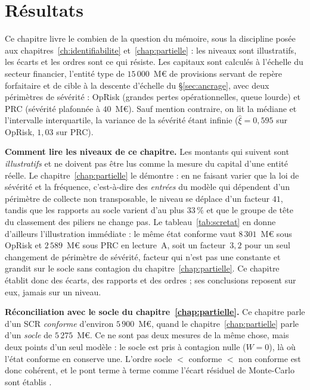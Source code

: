 \chapter{Résultats}
\label{chap:resultats}

Ce chapitre livre le \og combien \fg{} de la question du mémoire, sous la discipline posée
aux chapitres~\ref{ch:identifiabilite} et~\ref{chap:partielle} : les niveaux sont
illustratifs, les écarts et les ordres sont ce qui résiste. Les capitaux sont calculés à
l'échelle du secteur financier, l'entité type de $15\,000$~M\euro{} de provisions servant de
repère forfaitaire et de cible à la descente d'échelle du \S\ref{sec:ancrage}, avec
deux périmètres de sévérité : OpRisk (grandes pertes opérationnelles, queue lourde)
et PRC (sévérité plafonnée à $40$~M\euro). Sauf mention contraire, on lit la médiane
et l'intervalle interquartile, la variance de la sévérité étant infinie ($\hat\xi=0{,}595$ sur
OpRisk, $1{,}03$ sur PRC).

\begin{attention}
\textbf{Comment lire les niveaux de ce chapitre.} Les montants qui suivent sont
\emph{illustratifs} et ne doivent pas être lus comme la mesure du capital d'une entité réelle.
Le chapitre~\ref{chap:partielle} le démontre : en ne faisant varier que la loi de sévérité et la
fréquence, c'est-à-dire des \emph{entrées} du modèle qui dépendent d'un périmètre de collecte
non transposable, le niveau se déplace d'un facteur $41$, tandis que les rapports au socle
varient d'au plus $33\,\%$ et que le groupe de tête du classement des piliers ne change pas. Le
tableau~\ref{tab:scretat} en donne d'ailleurs l'illustration immédiate : le même état conforme
vaut $8\,301$~M\euro{} sous OpRisk et $2\,589$~M\euro{} sous PRC en lecture~A, soit un
facteur~$3{,}2$ pour un seul changement de périmètre de sévérité, facteur qui n'est pas une
constante et grandit sur le socle sans contagion du chapitre~\ref{chap:partielle}. Ce chapitre établit donc des écarts, des
rapports et des ordres ; ses conclusions reposent sur eux, jamais sur un niveau.
\end{attention}

\begin{cle}
\textbf{Réconciliation avec le socle du chapitre~\ref{chap:partielle}.} Ce chapitre parle d'un
SCR \emph{conforme} d'environ $5\,900$~M\euro{}, quand le chapitre~\ref{chap:partielle} parle
d'un \emph{socle} de $5\,275$~M\euro{}. Ce ne sont pas deux mesures de la même chose, mais deux
points d'un seul modèle : le socle est pris à contagion nulle ($W=0$), là où l'état
conforme en conserve une. L'ordre socle $<$ conforme $<$ non conforme est donc cohérent, et le
pont terme à terme comme l'écart résiduel de Monte-Carlo sont établis
\matcomp.
\end{cle}

